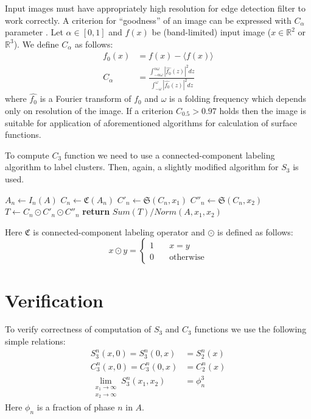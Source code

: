 \documentclass[1p]{elsarticle}
\begin{document}
Input images must have appropriately high resolution for edge detection filter
to work correctly. A criterion for ``goodness'' of an image can be expressed
with $C_{\alpha}$ parameter \cite{samarin2023robust}. Let $\alpha \in [0, 1]$
and $f(x)$ be (band-limited) input image ($x \in \mathbb{R}^2$ or
$\mathbb{R}^3$). We define $C_\alpha$ as follows:
\begin{equation}
  \begin{aligned}
    f_0(x) &= f(x) - \langle f(x) \rangle \\
    C_\alpha &= \frac{\int_{-\alpha\omega}^{\alpha\omega} |\hat{f_0}(z)|^2
      dz}{\int_{-\omega}^{\omega} |\hat{f_0}(z)|^2 dz}
  \end{aligned}
\end{equation}
where $\hat{f_0}$ is a Fourier transform of $f_0$ and $\omega$ is a folding
frequency which depends only on resolution of the image. If a criterion
$C_{0.5} > 0.97$ holds then the image is suitable for application of
aforementioned algorithms for calculation of surface functions.

To compute $C_3$ function we need to use a connected-component labeling
algorithm \cite{4728561,PhysRevB.14.3438} to label clusters. Then, again, a
slightly modified algorithm for $S_3$ is used.
\begin{algorithmic}[1]
  \State $A_n \gets I_n (A)$
  \State $C_n \gets \mathfrak{C}(A_n)$
  \State $C'_n \gets \mathfrak{S}(C_n, x_1)$
  \State $C''_n \gets \mathfrak{S}(C_n, x_2)$
  \State $T \gets C_n \odot C'_n \odot C''_n$
  \State \textbf{return} $Sum(T) / Norm(A, x_1, x_2)$
  \EndProcedure
\end{algorithmic}
Here $\mathfrak{C}$ is connected-component labeling operator and $\odot$ is
defined as follows:
\begin{equation}
  x \odot y = \left\{
  \begin{array}{ll}
    1 & \quad x = y \\
    0 & \quad \text{otherwise}
  \end{array}
  \right.
\end{equation}

\section{Verification}
To verify correctness of computation of $S_3$ and $C_3$ functions we use the
following simple relations:
\begin{align}
  S_3^n (x, 0) = S_3^n (0, x) &= S_2^n(x) \\
  C_3^n (x, 0) = C_3^n (0, x) &= C_2^n(x) \\
  \lim_{\substack{x_1 \to \infty \\ x_2 \to \infty}} S_3^n (x_1, x_2) &= \phi_n^3
\end{align}
Here $\phi_n$ is a fraction of phase $n$ in $A$.
\end{document}
